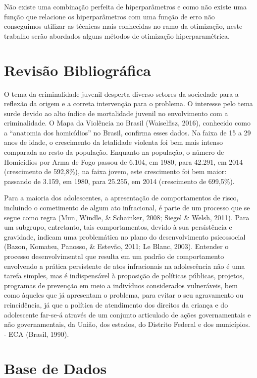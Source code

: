 \documentclass[
	12pt,				%
	a4paper,		%
	oneside,    %
	chapter=TITLE,		   %
	section=TITLE,		   %
	subsection=TITLE,	   %
	subsubsection=TITLE, %
	english,			%
	french,				%
	spanish,			%
	brazil,				%
]{abntex2}
\begin{document}
Não existe uma combinação perfeita de hiperparâmetros e como não existe
uma função que relacione os hiperparâmetros com uma função de erro não
conseguimos utilizar as técnicas mais conhecidas no ramo da otimização,
neste trabalho serão abordados alguns métodos de otimização
hiperparamétrica.

\hypertarget{revisuxe3o-bibliogruxe1fica}{%
\chapter{Revisão Bibliográfica}\label{revisuxe3o-bibliogruxe1fica}}

O tema da criminalidade juvenil desperta diverso setores da sociedade
para a reflexão da origem e a correta intervenção para o problema. O
interesse pelo tema surde devido ao alto índice de mortalidade juvenil
no envolvimento com a criminalidade. O Mapa da Violência no Brasil
(Waiselfisz, 2016), conhecido como a ``anatomia dos homicídios'' no
Brasil, confirma esses dados. Na faixa de 15 a 29 anos de idade, o
crescimento da letalidade violenta foi bem mais intenso comparada ao
resto da população. Enquanto na população, o número de Homicídios por
Arma de Fogo passou de 6.104, em 1980, para 42.291, em 2014 (crescimento
de 592,8\%), na faixa jovem, este crescimento foi bem maior: passando de
3.159, em 1980, para 25.255, em 2014 (crescimento de 699,5\%).

Para a maioria dos adolescentes, a apresentação de comportamentos de
risco, incluindo o cometimento de algum ato infracional, é parte de um
processo que se segue como regra (Mun, Windle, \& Schainker, 2008;
Siegel \& Welsh, 2011). Para um subgrupo, entretanto, tais
comportamentos, devido à sua persistência e gravidade, indicam uma
problemática no plano do desenvolvimento psicossocial (Bazon, Komatsu,
Panosso, \& Estevão, 2011; Le Blanc, 2003). Entender o processo
desenvolvimental que resulta em um padrão de comportamento envolvendo a
prática persistente de atos infracionais na adolescência não é uma
tarefa simples, mas é indispensável à proposição de políticas públicas,
projetos, programas de prevenção em meio a indivíduos considerados
vulneráveis, bem como àqueles que já apresentam o problema, para evitar
o seu agravamento ou reincidência, já que a política de atendimento dos
direitos da criança e do adolescente far-se-á através de um conjunto
articulado de ações governamentais e não governamentais, da União, dos
estados, do Distrito Federal e dos municípios. - ECA (Brasil, 1990).

\hypertarget{base-de-dados}{%
\chapter{Base de Dados}\label{base-de-dados}}
\end{document}
